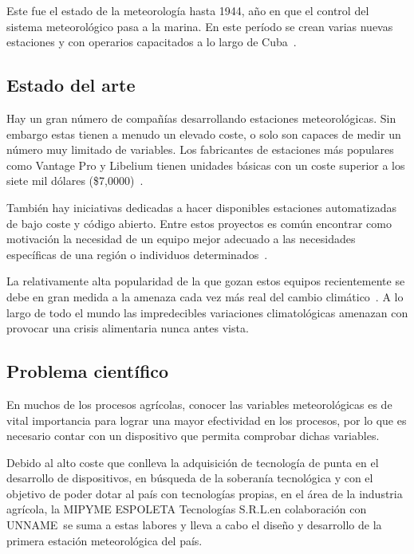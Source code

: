 \documentclass[conference, a4paper]{IEEEtran}
\newcommand{\espoleta}{ESPOLETA Tecnologías S.R.L.}
\newcommand{\client}{UNNAME~}
\begin{document}
Este fue el estado de la meteorología hasta 1944, año en que el control del
sistema meteorológico pasa a la marina.
En este período se crean varias nuevas estaciones y con operarios capacitados a
lo largo de Cuba~\cite{cubaHistoriaMeteorologiaCuba}.

\subsection{Estado del arte}\label{subsec:estado-del-arte}
Hay un gran número de compañías desarrollando estaciones meteorológicas.
Sin embargo estas tienen a menudo un elevado coste, o solo son capaces de medir
un número muy limitado de variables.
Los fabricantes de estaciones más populares como Vantage Pro y Libelium tienen
unidades básicas con un coste superior a los siete mil dólares
(\$7,0000)~\cite{botero-valenciaLowCostClimate2022a}.

También hay iniciativas dedicadas a hacer disponibles estaciones automatizadas
de bajo coste y código abierto.
Entre estos proyectos es común encontrar como motivación la necesidad de un
equipo mejor adecuado a las necesidades específicas de una región o individuos
determinados~\cite{bernardesPrototypingLowcostAutomatic2022,
	nettoOpensourceAutomaticWeather2019}.

La relativamente alta popularidad de la que gozan estos equipos recientemente
se debe en gran medida a la amenaza cada vez más real del cambio
climático~\cite{zizingaClimateChangeMaize2022,
	ahmadHistoricalClimateChange2022, taoClimateWarmingOutweighed2022,
	aprakuClimateChangeSmallscale2021}.
A lo largo de todo el mundo las impredecibles variaciones climatológicas
amenazan con provocar una crisis alimentaria nunca antes
vista\cite{ibrahimCombatingClimateChange2022, guoImpactClimateChange2022}.

\subsection{Problema científico}\label{subsec:problema-cientifico}
En muchos de los procesos agrícolas, conocer las variables meteorológicas es de
vital importancia para lograr una mayor efectividad en los procesos, por lo que
es necesario contar con un dispositivo que permita comprobar dichas variables.

Debido al alto coste que conlleva la adquisición de tecnología de punta en el
desarrollo de dispositivos, en búsqueda de la soberanía tecnológica y con el
objetivo de poder dotar al país con tecnologías propias, en el área de la
industria agrícola, la MIPYME \espoleta en colaboración con \client se suma a
estas labores y lleva a cabo el diseño y desarrollo de la primera estación
meteorológica del país.
\end{document}
